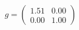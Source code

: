 \documentclass[preview]{standalone}
\begin{document}
\begin{align*}
g = \begin{pmatrix} 1.51 & 0.00 \\ 0.00 & 1.00 \end{pmatrix}
\end{align*}
\end{document}

